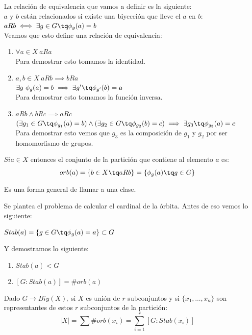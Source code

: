 \documentclass[nochap]{apuntes}
\begin{document}
La relación de equivalencia que vamos a definir es la siguiente:\\
$a$ y $b$ están relacionados si existe una biyección que lleve el $a$ en $b$:\\ $aRb \iff \exists g\in G \tq \phi _g(a)=b$\\

Veamos que esto define una relación de equivalencia:\\
\begin{enumerate}
\item $\forall a \in X\ aRa$\\Para demostrar esto tomamos la identidad.
\item $a,b \in X\ aRb \implies bRa$\\$\exists g \ \phi_g(a) = b \implies \exists g' \tq \phi _{g'}(b) = a$\\Para demostrar esto tomamos la función inversa.
\item $aRb \wedge bRc \implies aRc$\\$(\exists g_1\in G \tq \phi_{g_1}(a) = b) \wedge (\exists g_2\in G \tq \phi_{g_2}(b) = c) \implies \exists g_3 \tq \phi_{g_3}(a) = c$\\Para demostrar esto vemos que $g_3$ es la composición de $g_1$ y $g_2$ por ser homomorfismo de grupos.
\end{enumerate}

\begin{defn}[Órbita]
$Si a\in X$ entonces el conjunto de la partición que contiene al elemento $a$ es:\\

$$orb(a) = \{ b\in X\tq aRb\} = \{ \phi_g(a) \tq g\in G\}$$

Es una forma general de llamar a una clase.
\end{defn}

Se plantea el problema de calcular el cardinal de la órbita.
Antes de eso vemos lo siguiente:

\begin{defn}[Estabilizador]
$Stab(a) = \{ g\in G \tq \phi_g (a) = a\} \subset G$
\end{defn}

Y demostramos lo siguiente:
\begin{enumerate}
\item $Stab(a) < G$
\item $[G: Stab(a)] = \# orb(a)$
\end{enumerate}

\obs Dado $G\longrightarrow Biy(X)$, si $X$ es unión de $r$ subconjuntos y si $\{ x_1, \hdots, x_n\} $ son representantes de estos $r$ subconjuntos de la partición:\\
$$|X| = \sum \# orb(x_i) = \sum_{i=1}^r[G:Stab(x_i)]$$
\end{document}
